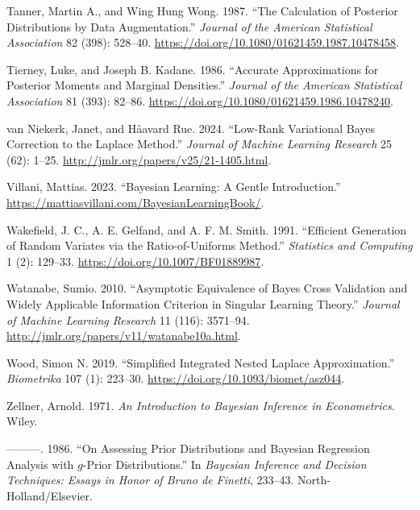 \documentclass[
  11pt,
  letterpaper,
]{scrbook}
\newlength{\cslhangindent}
\newenvironment{CSLReferences}[2] %
 {\begin{list}{}{%
  \setlength{\itemindent}{0pt}
  \setlength{\leftmargin}{0pt}
  \setlength{\parsep}{0pt}
  \ifodd #1
   \setlength{\leftmargin}{\cslhangindent}
   \setlength{\itemindent}{-1\cslhangindent}
  \fi
  \setlength{\itemsep}{#2\baselineskip}}}
 {\end{list}}
\theoremstyle{definition}
\theoremstyle{definition}
\theoremstyle{definition}
\theoremstyle{plain}
\theoremstyle{plain}
\theoremstyle{plain}
\theoremstyle{remark}
\begin{document}
\begin{CSLReferences}{1}{0}
Tanner, Martin A., and Wing Hung Wong. 1987. {``The Calculation of
Posterior Distributions by Data Augmentation.''} \emph{Journal of the
American Statistical Association} 82 (398): 528--40.
\url{https://doi.org/10.1080/01621459.1987.10478458}.

Tierney, Luke, and Joseph B. Kadane. 1986. {``Accurate Approximations
for Posterior Moments and Marginal Densities.''} \emph{Journal of the
American Statistical Association} 81 (393): 82--86.
\url{https://doi.org/10.1080/01621459.1986.10478240}.

van Niekerk, Janet, and Håavard Rue. 2024. {``Low-Rank Variational
{B}ayes Correction to the {L}aplace Method.''} \emph{Journal of Machine
Learning Research} 25 (62): 1--25.
\url{http://jmlr.org/papers/v25/21-1405.html}.

Villani, Mattias. 2023. {``Bayesian Learning: A Gentle Introduction.''}
\url{https://mattiasvillani.com/BayesianLearningBook/}.

Wakefield, J. C., A. E. Gelfand, and A. F. M. Smith. 1991. {``Efficient
Generation of Random Variates via the Ratio-of-Uniforms Method.''}
\emph{Statistics and Computing} 1 (2): 129--33.
\url{https://doi.org/10.1007/BF01889987}.

Watanabe, Sumio. 2010. {``Asymptotic Equivalence of {B}ayes Cross
Validation and Widely Applicable Information Criterion in Singular
Learning Theory.''} \emph{Journal of Machine Learning Research} 11
(116): 3571--94. \url{http://jmlr.org/papers/v11/watanabe10a.html}.

Wood, Simon N. 2019. {``Simplified Integrated Nested {L}aplace
Approximation.''} \emph{Biometrika} 107 (1): 223--30.
\url{https://doi.org/10.1093/biomet/asz044}.

Zellner, Arnold. 1971. \emph{An Introduction to {B}ayesian Inference in
Econometrics}. Wiley.

---------. 1986. {``On Assessing Prior Distributions and {B}ayesian
Regression Analysis with \(g\)-Prior Distributions.''} In
\emph{{B}ayesian Inference and Decision Techniques: Essays in Honor of
{B}runo de {F}inetti}, 233--43. North-Holland/Elsevier.

\end{CSLReferences}


\backmatter
\end{document}
